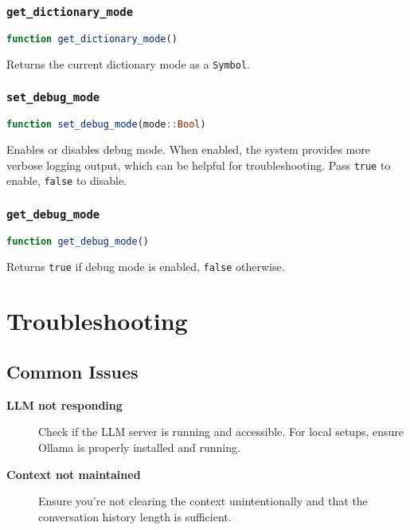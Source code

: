 \documentclass[11pt,a4paper]{article}
\newcommand{\code}[1]{\texttt{#1}}
\newcommand{\important}[1]{\textbf{#1}}
\newcommand{\func}[1]{\texttt{#1}}
\providecommand{\code}[1]{\texttt{\color{blue!70!black}#1}}
\providecommand{\important}[1]{\textbf{\color{red!70!black}#1}}
\begin{document}
\subsubsection{\func{get\_dictionary\_mode}}
\begin{lstlisting}[language=Julia]
function get_dictionary_mode()
\end{lstlisting}
Returns the current dictionary mode as a \code{Symbol}.

\subsubsection{\func{set\_debug\_mode}}
\begin{lstlisting}[language=Julia]
function set_debug_mode(mode::Bool)
\end{lstlisting}
Enables or disables debug mode. When enabled, the system provides more verbose logging output, which can be helpful for troubleshooting. Pass \code{true} to enable, \code{false} to disable.

\subsubsection{\func{get\_debug\_mode}}
\begin{lstlisting}[language=Julia]
function get_debug_mode()
\end{lstlisting}
Returns \code{true} if debug mode is enabled, \code{false} otherwise.


\section{Troubleshooting}
\label{sec:troubleshooting}

\subsection{Common Issues}

\begin{description}
    \item[\important{LLM not responding}] Check if the LLM server is running and accessible. For local setups, ensure Ollama is properly installed and running.
    
    \item[\important{Context not maintained}] Ensure you're not clearing the context unintentionally and that the conversation history length is sufficient.
\end{description}
\end{document}
